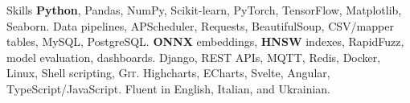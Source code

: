 

\begin{rubric}{Skills}
	\small{\textbf{Python}, Pandas, NumPy, Scikit-learn, PyTorch, TensorFlow, Matplotlib, Seaborn.}
	\small {Data pipelines, APScheduler, Requests, BeautifulSoup, CSV/mapper tables, MySQL, PostgreSQL.}
%
	\small{\textbf{ONNX} embeddings, \textbf{HNSW} indexes, RapidFuzz, model evaluation, dashboards.}
%
	\small{Django, REST APIs, MQTT, Redis, Docker, Linux, Shell scripting, \textsc{Git}.}
%
	\small{Highcharts, ECharts, Svelte, Angular, TypeScript/JavaScript.}
%
	\small {Fluent in English, Italian, and Ukrainian.}
\end{rubric}
